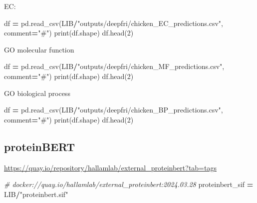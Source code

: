 \documentclass[
]{book}
\newenvironment{Shaded}{\begin{snugshade}}{\end{snugshade}}
\newcommand{\BuiltInTok}[1]{#1}
\newcommand{\CommentTok}[1]{\textcolor[rgb]{0.56,0.35,0.01}{\textit{#1}}}
\newcommand{\DecValTok}[1]{\textcolor[rgb]{0.00,0.00,0.81}{#1}}
\newcommand{\NormalTok}[1]{#1}
\newcommand{\OperatorTok}[1]{\textcolor[rgb]{0.81,0.36,0.00}{\textbf{#1}}}
\newcommand{\StringTok}[1]{\textcolor[rgb]{0.31,0.60,0.02}{#1}}
\begin{document}
EC:

\begin{Shaded}
\begin{Highlighting}[numbers=left,,]
\NormalTok{df }\OperatorTok{=}\NormalTok{ pd.read\_csv(LIB}\OperatorTok{/}\StringTok{"outputs/deepfri/chicken\_EC\_predictions.csv"}\NormalTok{, comment}\OperatorTok{=}\StringTok{"\#"}\NormalTok{)}
\BuiltInTok{print}\NormalTok{(df.shape)}
\NormalTok{df.head(}\DecValTok{2}\NormalTok{)}
\end{Highlighting}
\end{Shaded}

GO molecular function

\begin{Shaded}
\begin{Highlighting}[numbers=left,,]
\NormalTok{df }\OperatorTok{=}\NormalTok{ pd.read\_csv(LIB}\OperatorTok{/}\StringTok{"outputs/deepfri/chicken\_MF\_predictions.csv"}\NormalTok{, comment}\OperatorTok{=}\StringTok{"\#"}\NormalTok{)}
\BuiltInTok{print}\NormalTok{(df.shape)}
\NormalTok{df.head(}\DecValTok{2}\NormalTok{)}
\end{Highlighting}
\end{Shaded}

GO biological process

\begin{Shaded}
\begin{Highlighting}[numbers=left,,]
\NormalTok{df }\OperatorTok{=}\NormalTok{ pd.read\_csv(LIB}\OperatorTok{/}\StringTok{"outputs/deepfri/chicken\_BP\_predictions.csv"}\NormalTok{, comment}\OperatorTok{=}\StringTok{"\#"}\NormalTok{)}
\BuiltInTok{print}\NormalTok{(df.shape)}
\NormalTok{df.head(}\DecValTok{2}\NormalTok{)}
\end{Highlighting}
\end{Shaded}

\subsection{proteinBERT}\label{proteinbert}

\url{https://quay.io/repository/hallamlab/external_proteinbert?tab=tags}

\begin{Shaded}
\begin{Highlighting}[numbers=left,,]
\CommentTok{\# docker://quay.io/hallamlab/external\_proteinbert:2024.03.28}
\NormalTok{proteinbert\_sif }\OperatorTok{=}\NormalTok{ LIB}\OperatorTok{/}\StringTok{"proteinbert.sif"}
\end{Highlighting}
\end{Shaded}
\end{document}
